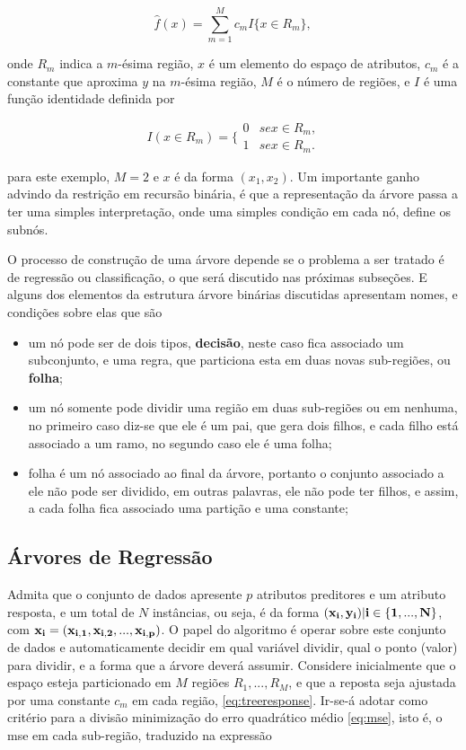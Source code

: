 \begin{equation}\label{eq:treeresponse}
\hat{f}(x)=\sum_{m=1}^Mc_mI\{x\in{R_m}\}\mbox{,}~
\end{equation}

onde $R_m$ indica a $m$-ésima região, $x$ é um elemento do espaço de atributos, $c_m$ é a constante que aproxima $y$ na $m$-ésima região, $M$ é o número de regiões, e $I$ é uma função identidade definida por

\begin{equation}
I(x\in{R_m})=\Big\{\begin{array}{cc}
0&se x\in{R_m}\mbox{,}\\ 
1&se x\in{R_m}\mbox{.}
\end{array}
\end{equation}

\noindent
para este exemplo, $M=2$ e $x$ é da forma $(x_1, x_2)$. Um importante ganho advindo da restrição em recursão binária, é que a representação da árvore passa a ter uma simples interpretação, onde uma simples condição em cada nó, define os subnós. 

O processo de construção de uma árvore depende se o problema a ser tratado é de regressão ou classificação, o que será discutido nas próximas subseções. E alguns dos elementos da estrutura árvore binárias discutidas apresentam nomes, e condições sobre elas que são

\begin{itemize}
\item um nó pode ser de dois tipos, {\bf decisão}, neste caso fica associado um subconjunto, e uma regra, que particiona esta em duas novas sub-regiões, ou {\bf folha};
\item um nó somente pode dividir uma região em duas sub-regiões ou em nenhuma, no primeiro caso diz-se que ele é um pai, que gera dois filhos, e cada filho está associado a um ramo, no segundo caso ele é uma folha;
\item folha é um nó associado ao final da árvore, portanto o conjunto associado a ele não pode ser dividido, em outras palavras, ele não pode ter filhos, e assim, a cada folha fica associado uma partição e uma constante;
\end{itemize}


\subsection{Árvores de Regressão}

Admita que o conjunto de dados apresente $p$ atributos preditores e um atributo resposta, e um total de $N$ instâncias, ou seja, é da forma $(\bf{x}_i,y_i)|i\in\{1,...,N\}$, com $\bf{x}_i=(x_{i,1}, x_{i,2}, ..., x_{i,p})$. O papel do algoritmo é operar sobre este conjunto de dados e automaticamente decidir em qual variável dividir, qual o ponto (valor) para dividir, e a forma que a árvore deverá assumir. Considere inicialmente que o espaço esteja particionado em $M$ regiões $R_1,...,R_M$, e que a reposta seja ajustada por uma constante $c_m$ em cada região, \eqref{eq:treeresponse}. Ir-se-á adotar como critério para a divisão minimização do erro quadrático médio \eqref{eq:mse}, isto é, o mse em cada sub-região, traduzido na expressão

